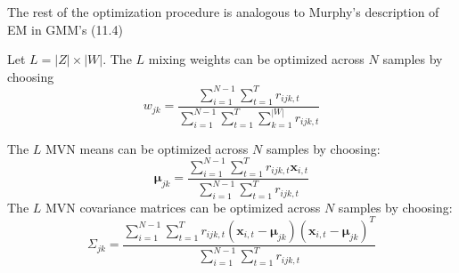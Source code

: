 \documentclass{article}
\begin{document}
\begin{enumerate}
	The rest of the optimization procedure is analogous to Murphy's description of EM in GMM's (11.4)
	
	Let $L = |Z| \times |W|$. The $L$ mixing weights can be optimized across $N$ samples by choosing
	$$
	w_{jk} = \frac{\sum_{i=1}^{N-1} \sum_{t=1}^{T} r_{ijk, t} }{\sum_{i=1}^{N-1} \sum_{t=1}^{T} \sum_{k=1}^{|W|} r_{ijk, t}}
	$$
	
	The $L$ MVN means can be optimized across $N$ samples by choosing:
	$$ 
	\pmb{\mu}_{jk} = \frac{\sum_{i=1}^{N-1} \sum_{t=1}^{T} r_{ijk, t} \pmb{x}_{i,t}}{\sum_{i=1}^{N-1} \sum_{t=1}^{T} r_{ijk, t} }
	$$
	The $L$ MVN covariance matrices can be optimized across $N$ samples by choosing: 
	$$
	\Sigma_{jk} = \frac{\sum_{i=1}^{N-1} \sum_{t=1}^{T} r_{ijk, t} (\pmb{x}_{i,t} - \pmb{\mu}_{jk})(\pmb{x}_{i,t} - \pmb{\mu}_{jk})^T}{\sum_{i=1}^{N-1} \sum_{t=1}^{T} r_{ijk, t}}
	$$
	
\end{enumerate}
\end{document}
